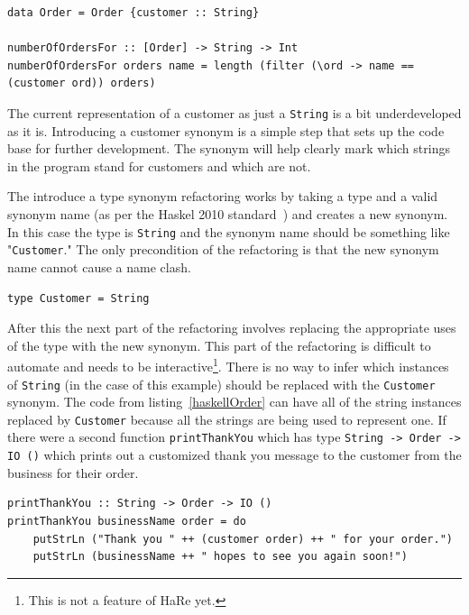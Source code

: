 \begin{lstlisting}[label=haskellOrder,caption={An order algebraic data type.}]
data Order = Order {customer :: String}

numberOfOrdersFor :: [Order] -> String -> Int
numberOfOrdersFor orders name = length (filter (\ord -> name == (customer ord)) orders)
\end{lstlisting}

The current representation of a customer as just a \texttt{String} is a bit underdeveloped as it is. Introducing a customer synonym is a simple step that sets up the code base for further development. The synonym will help clearly mark which strings in the program stand for customers and which are  not.

The introduce a type synonym refactoring works by taking a type and a valid synonym name (as per the Haskel 2010 standard~\citep{haskell2010}) and creates a new synonym. In this case the type is \texttt{String} and the synonym name should be something like "\texttt{Customer}." The only precondition of the refactoring is that the new synonym name cannot cause a name clash. 

\begin{lstlisting}[caption={The customer synonym}]
type Customer = String
\end{lstlisting}

After this the next part of the refactoring involves replacing the appropriate uses of the type with the new synonym. This part of the refactoring is difficult to automate and needs to be interactive\footnote{This is not a feature of HaRe yet.}. There is no way to infer which instances of \texttt{String} (in the case of this example) should be replaced with the \texttt{Customer} synonym. The code from listing~\ref{haskellOrder} can have all of the string instances replaced by \texttt{Customer} because all the strings are being used to represent one. If there were a second function \texttt{printThankYou} which has type \texttt{String -> Order -> IO ()} which prints out a customized thank you message to the customer from the business for their order. 

\begin{lstlisting}[caption={The printThankYou function}]
printThankYou :: String -> Order -> IO ()
printThankYou businessName order = do
	putStrLn ("Thank you " ++ (customer order) ++ " for your order.")
	putStrLn (businessName ++ " hopes to see you again soon!")
\end{lstlisting}

